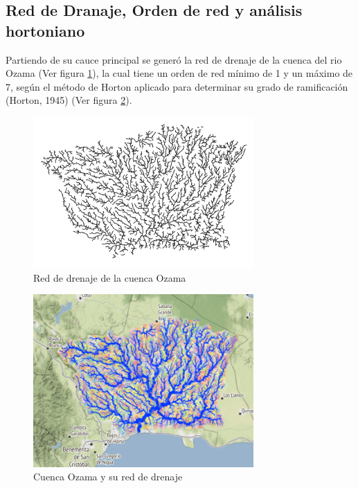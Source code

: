 \documentclass[11pt,]{article}
\begin{document}
\subsection{Red de Dranaje, Orden de red y análisis
hortoniano}\label{red-de-dranaje-orden-de-red-y-anuxe1lisis-hortoniano}

Partiendo de su cauce principal se generó la red de drenaje de la cuenca
del rio Ozama (Ver figura \ref{fig:drenaje}), la cual tiene un orden de
red mínimo de 1 y un máximo de 7, según el método de Horton aplicado
para determinar su grado de ramificación (Horton, 1945) (Ver figura
\ref{fig:C_O}).

\begin{figure}
\centering
\includegraphics[width=0.75000\textwidth]{Productos Generados/Red_drenaje_ozama.png}
\caption{\label{fig:drenaje}Red de drenaje de la cuenca Ozama}
\end{figure}

\begin{figure}
\centering
\includegraphics[width=0.75000\textwidth]{Productos Generados/cuencas_y_orden_de_red_salida1.png}
\caption{\label{fig:C_O}Cuenca Ozama y su red de drenaje}
\end{figure}
\end{document}
